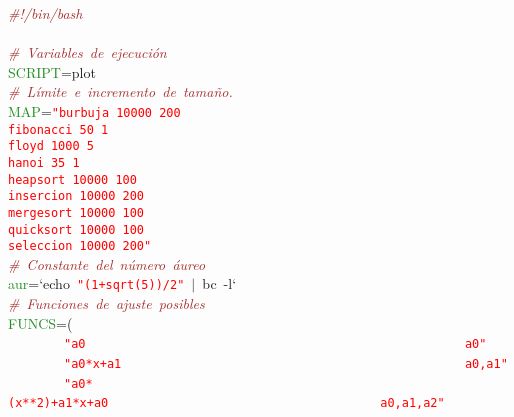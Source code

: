 \noindent
\mbox{}\textit{\textcolor{Brown}{\#!/bin/bash}} \\
\mbox{} \\
\mbox{}\textit{\textcolor{Brown}{\#\ Variables\ de\ ejecución}} \\
\mbox{}\textcolor{ForestGreen}{SCRIPT}\textcolor{BrickRed}{=}plot \\
\mbox{}\textit{\textcolor{Brown}{\#\ Límite\ e\ incremento\ de\ tamaño.}} \\
\mbox{}\textcolor{ForestGreen}{MAP}\textcolor{BrickRed}{=}\texttt{\textcolor{Red}{"{}burbuja\ 10000\ 200}} \\
\mbox{}\texttt{\textcolor{Red}{fibonacci\ 50\ 1}} \\
\mbox{}\texttt{\textcolor{Red}{floyd\ 1000\ 5}} \\
\mbox{}\texttt{\textcolor{Red}{hanoi\ 35\ 1}} \\
\mbox{}\texttt{\textcolor{Red}{heapsort\ 10000\ 100}} \\
\mbox{}\texttt{\textcolor{Red}{insercion\ 10000\ 200}} \\
\mbox{}\texttt{\textcolor{Red}{mergesort\ 10000\ 100}} \\
\mbox{}\texttt{\textcolor{Red}{quicksort\ 10000\ 100}} \\
\mbox{}\texttt{\textcolor{Red}{seleccion\ 10000\ 200"{}}} \\
\mbox{}\textit{\textcolor{Brown}{\#\ Constante\ del\ número\ áureo}} \\
\mbox{}\textcolor{ForestGreen}{aur}\textcolor{BrickRed}{=}`echo\ \texttt{\textcolor{Red}{"{}(1+sqrt(5))/2"{}}}\ \textcolor{BrickRed}{$|$}\ bc\ -l` \\
\mbox{}\textit{\textcolor{Brown}{\#\ Funciones\ de\ ajuste\ posibles}} \\
\mbox{}\textcolor{ForestGreen}{FUNCS}\textcolor{BrickRed}{=(}\  \\
\mbox{}\ \ \ \ \ \ \ \ \texttt{\textcolor{Red}{"{}a0\ \ \ \ \ \ \ \ \ \ \ \ \ \ \ \ \ \ \ \ \ \ \ \ \ \ \ \ \ \ \ \ \ \ \ \ \ \ \ \ \ \ \ \ \ \ \ \ \ \ \ \ \ a0"{}}} \\
\mbox{}\ \ \ \ \ \ \ \ \texttt{\textcolor{Red}{"{}a0*x+a1\ \ \ \ \ \ \ \ \ \ \ \ \ \ \ \ \ \ \ \ \ \ \ \ \ \ \ \ \ \ \ \ \ \ \ \ \ \ \ \ \ \ \ \ \ \ \ \ a0,a1"{}}} \\
\mbox{}\ \ \ \ \ \ \ \ \texttt{\textcolor{Red}{"{}a0*(x**2)+a1*x+a0\ \ \ \ \ \ \ \ \ \ \ \ \ \ \ \ \ \ \ \ \ \ \ \ \ \ \ \ \ \ \ \ \ \ \ \ \ \ a0,a1,a2"{}}}\ \ \ \ \ \  \\
